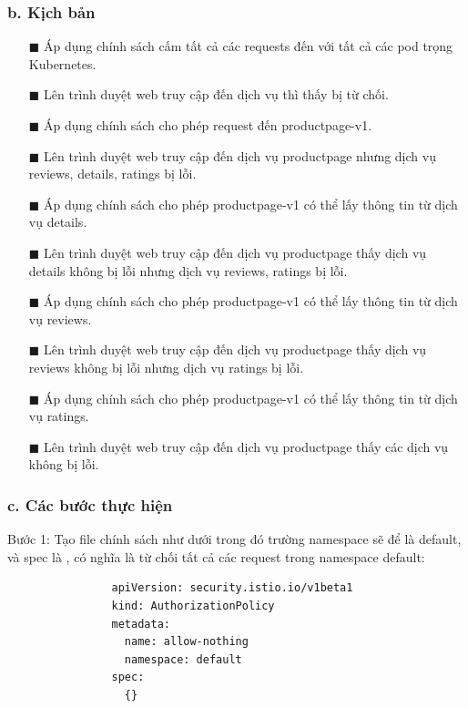 \documentclass[14pt,a4paper]{book}
\begin{document}
{{			\subsubsection{b. Kịch bản}
			\begin{enumerate}
				\item[$\blacksquare$] Áp dụng chính sách cấm tất cả các requests đến với tất cả các pod trọng Kubernetes.
				\item[$\blacksquare$] Lên trình duyệt web truy cập đến dịch vụ thì thấy bị từ chối.
				\item[$\blacksquare$] Áp dụng chính sách cho phép request đến productpage-v1.
				\item[$\blacksquare$] Lên trình duyệt web truy cập đến dịch vụ productpage nhưng dịch vụ reviews, details, ratings bị lỗi.
				\item[$\blacksquare$] Áp dụng chính sách cho phép productpage-v1 có thể lấy thông tin từ dịch vụ details.
				\item[$\blacksquare$] Lên trình duyệt web truy cập đến dịch vụ productpage thấy dịch vụ details không bị lỗi nhưng dịch vụ reviews, ratings bị lỗi.
				\item[$\blacksquare$] Áp dụng chính sách cho phép productpage-v1 có thể lấy thông tin từ dịch vụ reviews.
				\item[$\blacksquare$] Lên trình duyệt web truy cập đến dịch vụ productpage thấy dịch vụ reviews không bị lỗi nhưng dịch vụ ratings bị lỗi.
				\item[$\blacksquare$] Áp dụng chính sách cho phép productpage-v1 có thể lấy thông tin từ dịch vụ ratings.
				\item[$\blacksquare$] Lên trình duyệt web truy cập đến dịch vụ productpage thấy các dịch vụ không bị lỗi. 
			\end{enumerate}
			\subsubsection{c. Các bước thực hiện}
				Bước 1: Tạo file chính sách như dưới trong đó trường namespace sẽ để là default, và spec là {}, có nghĩa là từ chối tất cả các request trong namespace default:
				\begin{lstlisting}
				apiVersion: security.istio.io/v1beta1
				kind: AuthorizationPolicy
				metadata:
				  name: allow-nothing
				  namespace: default
				spec:
				  {}
				\end{lstlisting}
						
}}
\end{document}
